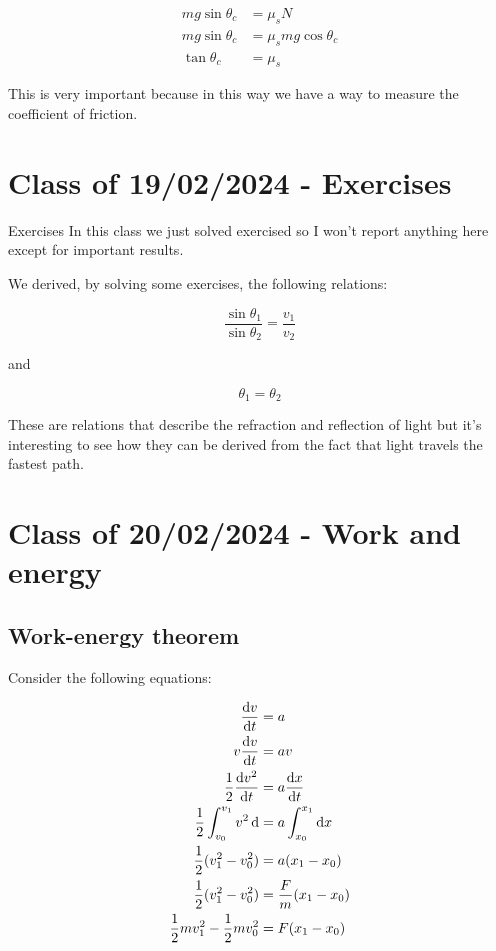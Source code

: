 \documentclass[10pt]{extarticle}
\begin{document}
\begin{align*}
  mg \sin \theta_c & = \mu_s N                \\
  mg \sin \theta_c & = \mu_s mg \cos \theta_c \\
  \tan \theta_c    & = \mu_s
\end{align*}

This is very important because in this way we have a way to measure the coefficient of friction.

\section{Class of 19/02/2024 - Exercises}

\begin{warningbox}{Exercises}
  In this class we just solved exercised so I won't report anything here except for important results.
\end{warningbox}

We derived, by solving some exercises, the following relations:

$$
  \frac{\sin \theta_1}{\sin \theta_2} = \frac{v_1}{v_2}
$$

and

$$
  \theta_1 = \theta_2
$$

These are relations that describe the refraction and reflection of light but it's interesting to see how they can be derived from the fact that light travels the fastest path.

\section{Class of 20/02/2024 - Work and energy}

\subsection{Work-energy theorem}

Consider the following equations:

\begin{align*}
  \dv{v}{t}                                 & = a                         \\
  v \dv{v}{t}                               & = a v                       \\
  \frac{1}{2} \dv{v^2}{t}                   & = a \dv{x}{t}               \\
  \frac{1}{2} \int_{v_0}^{v_1} v^2 \dd{}    & = a \int_{x_0}^{x_1} \dd{x} \\
  \frac{1}{2} (v_1^2 - v_0^2)               & = a (x_1 - x_0)             \\
  \frac{1}{2} (v_1^2 - v_0^2)               & = \frac{F}{m} (x_1 - x_0)   \\
  \frac{1}{2} m v_1^2 - \frac{1}{2} m v_0^2 & = F (x_1 - x_0)
\end{align*}
\end{document}
